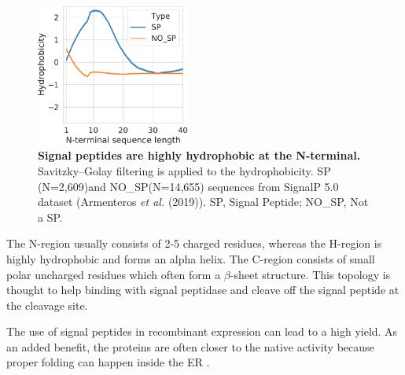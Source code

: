 \begin{figure}
  \begin{center}
    \includegraphics[width=0.45\textwidth]{chapters/Introduction/SignalPeptide/Figures/sp_nosp_lineplot.pdf}
    \caption[Signal peptides are highly hydrophobic at the N-terminal.]{\textbf{Signal peptides are highly hydrophobic at the N-terminal.} Savitzky–Golay filtering is applied to the hydrophobicity. SP (N=2,609)and NO\_SP(N=14,655) sequences from SignalP 5.0 dataset (Armenteros \textit{et al.} (2019)). SP, Signal Peptide; NO\_SP, Not a SP.}%
    \label{fig:signal_peptides}
  \end{center}
\end{figure}
The N-region usually consists of 2-5 charged residues, whereas the H-region is highly hydrophobic and forms an alpha helix. The C-region consists of small polar uncharged residues which often form a $\beta$-sheet structure. This topology is thought to help binding with signal peptidase and cleave off the signal peptide at the cleavage site. 


The use of signal peptides in recombinant expression can lead to a high yield. As an added benefit, the proteins are often closer to the native activity because proper folding can happen inside the ER \cite{Futatsumori-Sugai2010-iu, Karyolaimos2019-ip}. 

